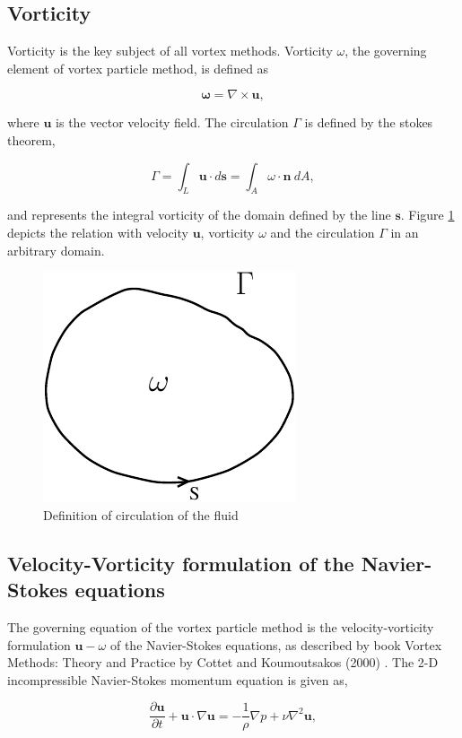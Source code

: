 \subsection{Vorticity}
Vorticity is the key subject of all vortex methods. Vorticity $\omega$, the governing element of vortex particle method, is defined as

	\begin{equation}
	\mathbf{\omega} = \nabla \times \mathbf{u},
	\end{equation}

where $\mathbf{u}$ is the vector velocity field. The circulation $\Gamma$ is defined by the stokes theorem,

	\begin{equation}
	\Gamma = \int_L\mathbf{u}\cdot d \mathbf{s}=\int_A\omega\cdot\mathbf{n}\ dA,
	\label{eq:definitionOfCirculation}
	\end{equation}

and represents the integral vorticity of the domain defined by the line $\mathbf{s}$. Figure \ref{fig:vorticityCirculation} depicts the relation with velocity $\mathbf{u}$, vorticity $\omega$ and the circulation $\Gamma$ in an arbitrary domain.

	\begin{figure}[t]
	\centering
	\includegraphics[width=0.3\linewidth]{./figures/lagrangian/vorticityCirculation.pdf}
	\caption{Definition of circulation of the fluid}
	\label{fig:vorticityCirculation}
	\end{figure}

 
\subsection{Velocity-Vorticity formulation of the Navier-Stokes equations}
The governing equation of the vortex particle method is the velocity-vorticity formulation $\mathbf{u}-\omega$ of the Navier-Stokes equations, as described by book Vortex Methods: Theory and Practice by Cottet and Koumoutsakos (2000) \cite{Cottet2000a}. The 2-D incompressible Navier-Stokes momentum equation is given as,

	\begin{equation}
	\frac{\partial \mathbf{u}}{\partial t} + \mathbf{u}\cdot\nabla\mathbf{u} = - \frac{1}{\rho} \nabla p + \nu \nabla^2\mathbf{u},
	\label{eq:mom}
	\end{equation}

